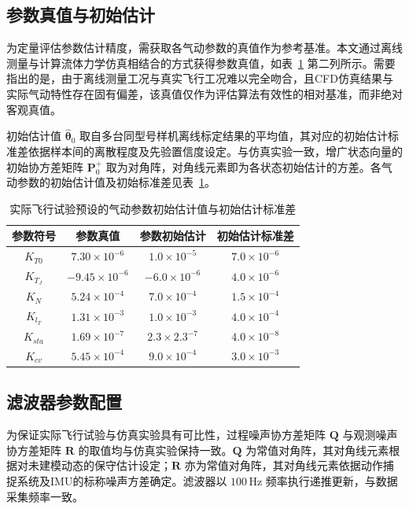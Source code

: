 \subsection{参数真值与初始估计}
为定量评估参数估计精度，需获取各气动参数的真值作为参考基准。本文通过离线测量与计算流体力学仿真相结合的方式获得参数真值，如表~\ref{tab:real_flight_true_theta} 第二列所示。需要指出的是，由于离线测量工况与真实飞行工况难以完全吻合，且CFD仿真结果与实际气动特性存在固有偏差，该真值仅作为评估算法有效性的相对基准，而非绝对客观真值。

初始估计值 \(\hat{\boldsymbol{\theta}}_0\) 取自多台同型号样机离线标定结果的平均值，其对应的初始估计标准差依据样本间的离散程度及先验置信度设定。与仿真实验一致，增广状态向量的初始协方差矩阵 \(\boldsymbol{P}_0^+\) 取为对角阵，对角线元素即为各状态初始估计的方差。各气动参数的初始估计值及初始标准差见表~\ref{tab:real_flight_true_theta}。

\begin{table}[htbp]
    \centering
    \caption{实际飞行试验预设的气动参数初始估计值与初始估计标准差}
    \label{tab:real_flight_true_theta}
    \begin{tabular}{cccc}
    \toprule
    参数符号 & 参数真值 & 参数初始估计 & 初始估计标准差 \\
    \midrule
    $K_{T0}$ & $7.30 \times 10^{-6}$ & $1.0 \times 10^{-5}$ & $7.0 \times 10^{-6}$ \\
    $K_{T_J}$ & $-9.45 \times 10^{-6}$ & $-6.0 \times 10^{-6}$ & $4.0 \times 10^{-6}$ \\
    $K_{N}$ & $5.24 \times 10^{-4}$ & $7.0 \times 10^{-4}$ & $1.5 \times 10^{-4}$ \\
    $K_{l_T}$ & $1.31 \times 10^{-3}$ & $1.0 \times 10^{-3}$ & $4.0 \times 10^{-4}$ \\
    $K_{sta}$ & $1.69 \times 10^{-7}$ & $2.3 \times 2.3^{-7}$ & $4.0 \times 10^{-8}$ \\
    $K_{cv}$ & $5.45 \times 10^{-4}$ & $9.0 \times 10^{-4}$ & $3.0 \times 10^{-3}$ \\
    \bottomrule
    \end{tabular}
\end{table}

\subsection{滤波器参数配置}
为保证实际飞行试验与仿真实验具有可比性，过程噪声协方差矩阵 \(\boldsymbol{Q}\) 与观测噪声协方差矩阵 \(\boldsymbol{R}\) 的取值均与仿真实验保持一致。\(\boldsymbol{Q}\) 为常值对角阵，其对角线元素根据对未建模动态的保守估计设定；\(\boldsymbol{R}\) 亦为常值对角阵，其对角线元素依据动作捕捉系统及IMU的标称噪声方差确定。滤波器以 \(100\,\mathrm{Hz}\) 频率执行递推更新，与数据采集频率一致。

